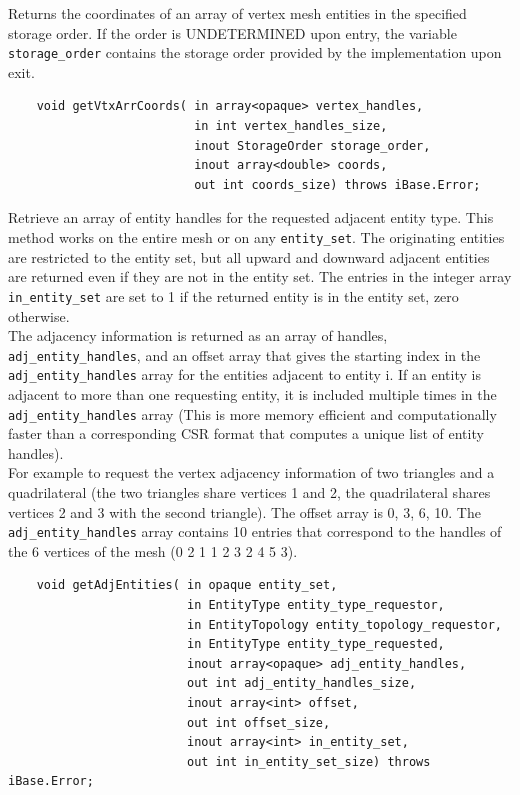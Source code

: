 \documentclass{article}
\begin{document}
Returns the coordinates of an array of vertex mesh entities in 
the specified storage order. If the order is UNDETERMINED upon 
entry, the variable {\tt storage\_order} contains the storage order 
provided by the implementation upon exit.

\begin{verbatim}
    void getVtxArrCoords( in array<opaque> vertex_handles, 
                          in int vertex_handles_size,  
                          inout StorageOrder storage_order, 
                          inout array<double> coords, 
                          out int coords_size) throws iBase.Error;
\end{verbatim}

Retrieve an array of entity handles for the requested adjacent 
entity type. This method works on the entire mesh or on any {\tt entity\_set}. 
The originating entities are restricted to the entity set, but 
all upward and downward adjacent entities are returned even if 
they are not in the entity set. The entries in the integer array 
{\tt in\_entity\_set} are set to 1 if the returned entity is in the 
entity set, zero otherwise. \\

The adjacency information is returned as an array of handles, 
{\tt adj\_entity\_handles}, and an offset array that gives the starting 
index in the {\tt adj\_entity\_handles} array for the entities adjacent 
to entity i. If an entity is adjacent to more than one requesting 
entity, it is included multiple times in the {\tt adj\_entity\_handles} 
array (This is more memory efficient and computationally faster 
than a corresponding CSR format that computes a unique list of 
entity handles). \\

For example to request the vertex adjacency information of two 
triangles and a quadrilateral (the two triangles share vertices 
1 and 2, the quadrilateral shares vertices 2 and 3 with the second 
triangle). The offset array is 0, 3, 6, 10. 
The {\tt adj\_entity\_handles} array contains 10 entries that correspond 
to the handles of the 6 vertices of the mesh (0 2 1 1 2 3 2 4 
5 3). 

\begin{verbatim}
    void getAdjEntities( in opaque entity_set,  
                         in EntityType entity_type_requestor,  
                         in EntityTopology entity_topology_requestor, 
                         in EntityType entity_type_requested, 
                         inout array<opaque> adj_entity_handles,   
                         out int adj_entity_handles_size, 
                         inout array<int> offset, 
                         out int offset_size, 
                         inout array<int> in_entity_set, 
                         out int in_entity_set_size) throws iBase.Error;
\end{verbatim}
\end{document}
